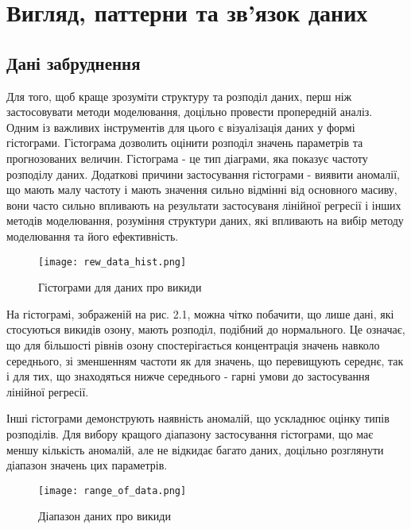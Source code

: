 \section{Вигляд, паттерни та зв'язок даних}

\subsection{Дані забруднення}

Для того, щоб краще зрозуміти структуру та розподіл даних, перш ніж застосовувати методи моделювання, доцільно провести пропередній аналіз. 
Одним із важливих інструментів для цього є візуалізація даних у формі гістограми. 
Гістограма дозволить оцінити розподіл значень параметрів та прогнозованих величин.
Гістограма - це тип діаграми, яка показує частоту розподілу даних. 
Додаткові причини застосування гістограми - виявити аномалії, що мають малу частоту і мають значення сильно відмінні від основного масиву,  вони часто сильно впливають на результати застосуваня лінійної регресії і інших методів моделювання, розуміння структури даних, які впливають на вибір методу моделювання та його ефективність.


\begin{figure}[h]
    \begin{center}
        \texttt{[image: rew\_data\_hist.png]}
        \caption{Гістограми для даних про викиди}
    \end{center}
\end{figure}

На гістограмі, зображеній на рис. 2.1, можна чітко побачити, що лише дані, які стосуються викидів озону, мають розподіл, подібний до нормального. 
Це означає, що для більшості рівнів озону спостерігається концентрація значень навколо середнього, зі зменшенням частоти як для значень, що перевищують середнє, так і для тих, що знаходяться нижче середнього - гарні умови до застосування лінійної регресії.


Інші гістограми демонструють наявність аномалій, що ускладнює оцінку типів розподілів. 
Для вибору кращого діапазону застосування гістограми, що має меншу кількість аномалій, але не відкидає багато даних, доцільно розглянути діапазон значень цих параметрів. 


\begin{figure}[H]
    \begin{center}
        \texttt{[image: range\_of\_data.png]}
        \caption{Діапазон даних про викиди}
    \end{center}
\end{figure}


